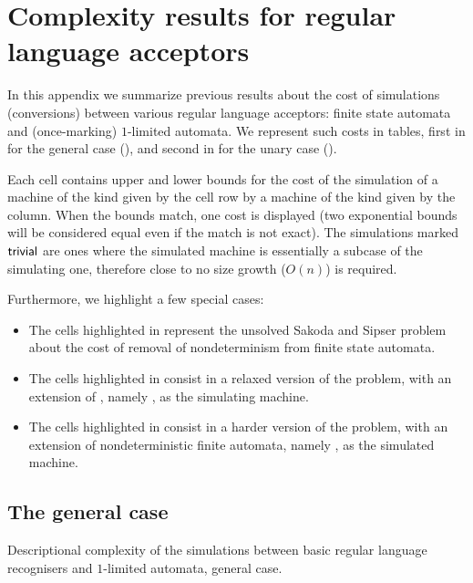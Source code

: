 \chapter{Complexity results for regular language acceptors}\label{app:results}
In this appendix we summarize previous results about the cost of simulations (conversions) between various regular language acceptors: finite state automata and (once-marking) $1$-limited automata.
We represent such costs in tables, first in  for the general case (), and second in  for the unary case ().

Each cell contains upper and lower bounds for the cost of the simulation of a machine of the kind given by the cell row by a machine of the kind given by the column.
When the bounds match, one cost is displayed (two exponential bounds will be considered equal even if the match is not exact).
The simulations marked $\mathsf{trivial}$ are ones where the simulated machine is essentially a subcase of the simulating one, therefore close to no size growth ($O(n)$) is required.

Furthermore, we highlight a few special cases:
\begin{itemize}
	\item The cells highlighted in  represent the unsolved Sakoda and Sipser problem \cite{SakSip78} about the cost of removal of nondeterminism from finite state automata.
	\item The cells highlighted in  consist in a relaxed version of the problem, with an extension of \TNFAs, namely \ODLAs, as the simulating machine.
	\item The cells highlighted in  consist in a harder version of the problem, with an extension of nondeterministic finite automata, namely \OLAs, as the simulated machine.
\end{itemize}


\section{The general case}\label{sec:sims-general}

\begin{table}
	\centering
	\caption{Descriptional complexity of the simulations between basic regular language recognisers and $1$-limited automata, general case.}
	\label{tab:sims-1la-general}
\end{table}

